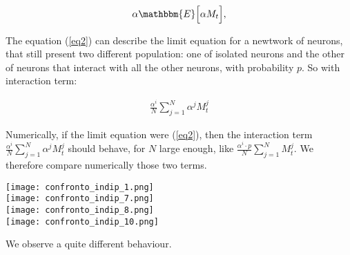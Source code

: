 \[ \alpha \mathbbm{E} \Big[ \alpha M_t \Big], \]

The equation (\ref{eq2}) can describe the limit equation for a newtwork of neurons, that still present two different population: one of isolated neurons and the other of neurons that interact with all the other neurons, with probability $p$. So with interaction term:

\begin{eqnarray*}
\frac{\alpha^i}{N} \sum_{j = 1}^N \alpha^j M^j_t
\end{eqnarray*}

Numerically, if the limit equation were (\ref{eq2}), then the interaction term $\frac{\alpha^i}{N} \sum_{j = 1}^N \alpha^j M^j_t$ should behave, for $N$ large enough, like $\frac{\alpha^i \cdot p}{N} \sum_{j = 1}^N M^j_t$. We therefore compare numerically those two terms. 

\begin{center}
  \texttt{[image: confronto\_indip\_1.png]}\\
  \texttt{[image: confronto\_indip\_7.png]}\\
  \texttt{[image: confronto\_indip\_8.png]}\\
  \texttt{[image: confronto\_indip\_10.png]}\\
\end{center}

We observe a quite different behaviour.  \\

